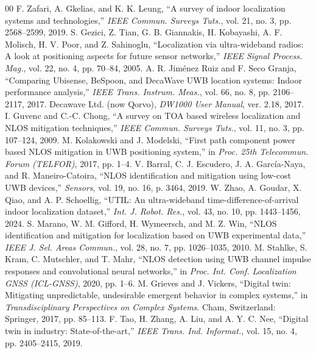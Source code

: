 \documentclass[conference]{IEEEtran}
\begin{document}
\begin{thebibliography}{00}
 F. Zafari, A. Gkelias, and K. K. Leung, ``A survey of indoor localization systems and technologies,'' \textit{IEEE Commun. Surveys Tuts.}, vol. 21, no. 3, pp. 2568--2599, 2019.
 S. Gezici, Z. Tian, G. B. Giannakis, H. Kobayashi, A. F. Molisch, H. V. Poor, and Z. Sahinoglu, ``Localization via ultra-wideband radios: A look at positioning aspects for future sensor networks,'' \textit{IEEE Signal Process. Mag.}, vol. 22, no. 4, pp. 70--84, 2005.
 A. R. Jim\'enez Ruiz and F. Seco Granja, ``Comparing Ubisense, BeSpoon, and DecaWave UWB location systems: Indoor performance analysis,'' \textit{IEEE Trans. Instrum. Meas.}, vol. 66, no. 8, pp. 2106--2117, 2017.
 Decawave Ltd. (now Qorvo), \textit{DW1000 User Manual}, ver. 2.18, 2017.
 I. Guvenc and C.-C. Chong, ``A survey on TOA based wireless localization and NLOS mitigation techniques,'' \textit{IEEE Commun. Surveys Tuts.}, vol. 11, no. 3, pp. 107--124, 2009.
 M. Kolakowski and J. Modelski, ``First path component power based NLOS mitigation in UWB positioning system,'' in \textit{Proc. 25th Telecommun. Forum (TELFOR)}, 2017, pp. 1--4.
 V. Barral, C. J. Escudero, J. A. Garc\'ia-Naya, and R. Maneiro-Catoira, ``NLOS identification and mitigation using low-cost UWB devices,'' \textit{Sensors}, vol. 19, no. 16, p. 3464, 2019.
 W. Zhao, A. Goudar, X. Qiao, and A. P. Schoellig, ``UTIL: An ultra-wideband time-difference-of-arrival indoor localization dataset,'' \textit{Int. J. Robot. Res.}, vol. 43, no. 10, pp. 1443--1456, 2024.
 S. Marano, W. M. Gifford, H. Wymeersch, and M. Z. Win, ``NLOS identification and mitigation for localization based on UWB experimental data,'' \textit{IEEE J. Sel. Areas Commun.}, vol. 28, no. 7, pp. 1026--1035, 2010.
 M. Stahlke, S. Kram, C. Mutschler, and T. Mahr, ``NLOS detection using UWB channel impulse responses and convolutional neural networks,'' in \textit{Proc. Int. Conf. Localization GNSS (ICL-GNSS)}, 2020, pp. 1--6.
 M. Grieves and J. Vickers, ``Digital twin: Mitigating unpredictable, undesirable emergent behavior in complex systems,'' in \textit{Transdisciplinary Perspectives on Complex Systems}. Cham, Switzerland: Springer, 2017, pp. 85--113.
 F. Tao, H. Zhang, A. Liu, and A. Y. C. Nee, ``Digital twin in industry: State-of-the-art,'' \textit{IEEE Trans. Ind. Informat.}, vol. 15, no. 4, pp. 2405--2415, 2019.

\end{thebibliography}
\end{document}
